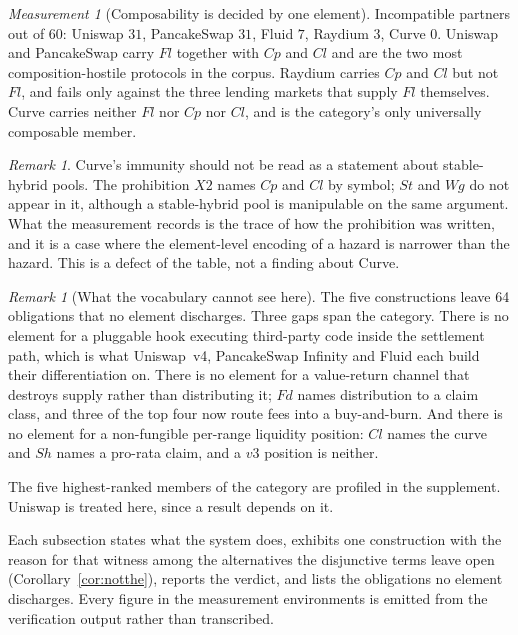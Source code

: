\documentclass[11pt,reqno]{amsart}
\theoremstyle{plain}
\theoremstyle{definition}
\theoremstyle{remark}
\newtheorem{measurement}[theorem]{Measurement}
\newtheorem{remark}[theorem]{Remark}
\begin{document}
\begin{measurement}[Composability is decided by one element]\label{meas:cat:dexcomp}
Incompatible partners out of $60$: Uniswap $31$, PancakeSwap $31$, Fluid $7$,
Raydium $3$, Curve $0$. Uniswap and PancakeSwap carry $Fl$ together with $Cp$
and $Cl$ and are the two most composition-hostile protocols in the corpus.
Raydium carries $Cp$ and $Cl$ but not $Fl$, and fails only against the three
lending markets that supply $Fl$ themselves. Curve carries neither $Fl$ nor
$Cp$ nor $Cl$, and is the category's only universally composable member.
\end{measurement}

\begin{remark}
Curve's immunity should not be read as a statement about stable-hybrid pools.
The prohibition $X2$ names $Cp$ and $Cl$ by symbol; $St$ and $Wg$ do not appear
in it, although a stable-hybrid pool is manipulable on the same argument. What
the measurement records is the trace of how the prohibition was written, and it
is a case where the element-level encoding of a hazard is narrower than the
hazard. This is a defect of the table, not a finding about Curve.
\end{remark}

\begin{remark}[What the vocabulary cannot see here]
The five constructions leave 64 obligations that no element discharges. Three gaps span the category.
There is no element for a pluggable hook executing third-party code inside the
settlement path, which is what Uniswap~v4, PancakeSwap Infinity and Fluid each
build their differentiation on. There is no element for a value-return channel
that destroys supply rather than distributing it; $Fd$ names distribution to a
claim class, and three of the top four now route fees into a buy-and-burn.
And there is no element for a non-fungible per-range liquidity position: $Cl$
names the curve and $Sh$ names a pro-rata claim, and a $v3$ position is neither.
\end{remark}

The five highest-ranked members of the category are profiled in the
supplement. Uniswap is treated here, since a result depends on it.

Each
subsection states what the system does, exhibits one construction with the
reason for that witness among the alternatives the disjunctive terms leave open
(Corollary~\ref{cor:notthe}), reports the verdict, and lists the obligations no
element discharges. Every figure in the measurement environments is emitted from
the verification output rather than transcribed.
\end{document}

